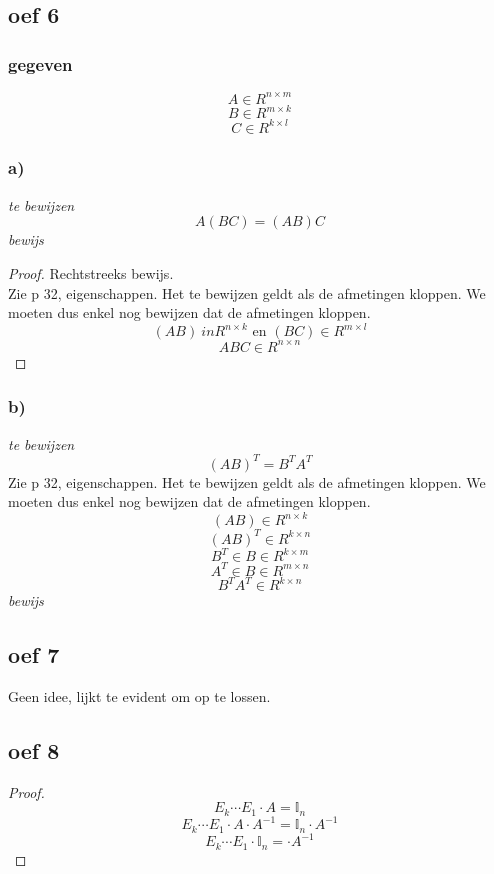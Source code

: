 \documentclass[lineaire_algebra_oplossingen.tex]{subfiles}
\begin{document}
\subsection{oef 6}
\subsubsection*{gegeven}
\[
A \in R^{n\times m}
\]
\[
B \in R^{m\times k}
\]
\[
C \in R^{k\times l}
\]
\subsubsection*{a)}
\emph{te bewijzen}
\[
A(BC) = (AB)C
\]
\emph{bewijs}
\begin{proof}
Rechtstreeks bewijs.\\
Zie p 32, eigenschappen. Het te bewijzen geldt als de afmetingen kloppen.
We moeten dus enkel nog bewijzen dat de afmetingen kloppen.
\[
(AB) \ in R^{n\times k} \text{ en } (BC) \in R^{m\times l}
\]
\[
ABC \in  R^{n\times n}
\]
\end{proof}

\subsubsection*{b)}
\emph{te bewijzen}
\[
(AB)^{T} = B^{T}A^{T}
\]
Zie p 32, eigenschappen. Het te bewijzen geldt als de afmetingen kloppen.
We moeten dus enkel nog bewijzen dat de afmetingen kloppen.
\[
(AB) \in R^{n\times k}
\]
\[
(AB)^T \in R^{k\times n}
\]
\[
B^{T} \in B \in R^{k\times m}
\]
\[
A^{T} \in B \in R^{m\times n}
\]
\[
 B^{T}A^{T} \in R^{k\times n}
\]
\emph{bewijs}
\subsection{oef 7}
Geen idee, lijkt te evident om op te lossen.
\subsection{oef 8}
\begin{proof}
\[
E_k\cdots E_1\cdot A = \mathbb{I}_n
\]
\[
E_k\cdots E_1\cdot A \cdot A^{-1} = \mathbb{I}_n \cdot A^{-1} 
\]
\[
E_k\cdots E_1\cdot \mathbb{I}_n =  \cdot A^{-1} 
\]
\end{proof}
\end{document}
